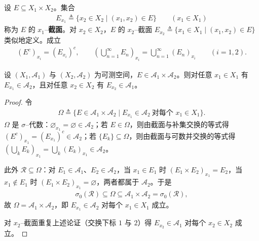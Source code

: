 \documentclass[../../main.tex]{subfiles}%
\begin{document}
设 $E\subseteq X_1\times X_2$。集合
\begin{align}
E_{x_1}\triangleq\{x_2\in X_2\mid(x_1,x_2)\in E\}\qquad(x_1\in X_1)\label{align:ch01-截面}
\end{align}
称为 $E$ 的 $x_1$--\textbf{截面}。对 $x_2\in X_2$，$E$ 的 $x_2$--截面 $E_{x_2}\triangleq\{x_1\in X_1\mid(x_1,x_2)\in E\}$ 类似地定义。成立
\begin{align*}
(E^c)_{x_i}=(E_{x_i})^c,\qquad\left(\bigcup_{n=1}^\infty E_n\right)_{x_i}=\bigcup_{n=1}^\infty(E_n)_{x_i}\qquad(i=1,2).
\end{align*}

\begin{proposition}\label{proposition:ch01-截面可测}\label{proposition:ch01-截口}\label{proposition:ch01-截面}
设 $(X_1,\mathcal{A}_1)$ 与 $(X_2,\mathcal{A}_2)$ 为可测空间，$E\in\mathcal{A}_1\times\mathcal{A}_2$。则对任意 $x_1\in X_1$ 有 $E_{x_1}\in\mathcal{A}_2$，且对任意 $x_2\in X_2$ 有 $E_{x_2}\in\mathcal{A}_1$。
\end{proposition}

\begin{proof}
令
\begin{align*}
\Omega\triangleq\{E\in\mathcal{A}_1\times\mathcal{A}_2\mid E_{x_1}\in\mathcal{A}_2\ \text{对每个 }x_1\in X_1\}.
\end{align*}
$\Omega$ 是 $\sigma$--代数：$\varnothing_{x_1}=\varnothing\in\mathcal{A}_2$；若 $E\in\Omega$，则由截面与补集交换的等式得 $(E^c)_{x_1}=(E_{x_1})^c\in\mathcal{A}_2$；若 $\{E_k\}\subseteq\Omega$，则由截面与可数并交换的等式得 $(\bigcup_kE_k)_{x_1}=\bigcup_k(E_k)_{x_1}\in\mathcal{A}_2$。

此外 $\mathcal{R}\subseteq\Omega$：对 $E_1\in\mathcal{A}_1$、$E_2\in\mathcal{A}_2$，当 $x_1\in E_1$ 时 $(E_1\times E_2)_{x_1}=E_2$，当 $x_1\notin E_1$ 时 $(E_1\times E_2)_{x_1}=\varnothing$，两者都属于 $\mathcal{A}_2$。于是
\begin{align*}
\sigma_0(\mathcal{R})\subseteq\Omega\subseteq\mathcal{A}_1\times\mathcal{A}_2=\sigma_0(\mathcal{R}),
\end{align*}
故 $\Omega=\mathcal{A}_1\times\mathcal{A}_2$，即 $E_{x_1}\in\mathcal{A}_2$ 对每个 $x_1\in X_1$ 成立。

对 $x_2$--截面重复上述论证（交换下标 $1$ 与 $2$）得 $E_{x_2}\in\mathcal{A}_1$ 对每个 $x_2\in X_2$ 成立。
\end{proof}
\end{document}
